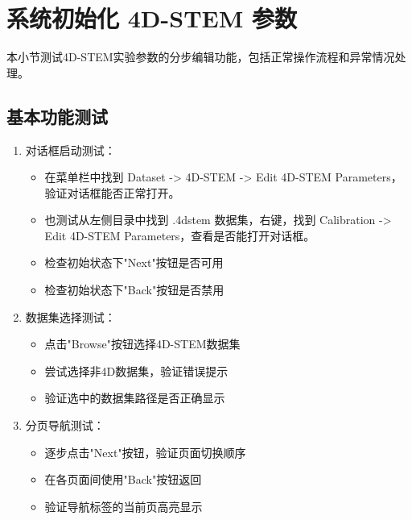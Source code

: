 \documentclass[a4paper,12pt]{report}	%
\begin{document}
\section{系统初始化 4D-STEM 参数}

本小节测试4D-STEM实验参数的分步编辑功能，包括正常操作流程和异常情况处理。

\subsection{基本功能测试}
\begin{enumerate}
    \item 对话框启动测试：
    \begin{itemize}
        \item 在菜单栏中找到 Dataset -> 4D-STEM -> Edit 4D-STEM Parameters， 验证对话框能否正常打开。
        \item 也测试从左侧目录中找到 .4dstem 数据集，右键，找到 Calibration -> Edit 4D-STEM Parameters，查看是否能打开对话框。
        \item 检查初始状态下"Next"按钮是否可用
        \item 检查初始状态下"Back"按钮是否禁用
    \end{itemize}
    
    \item 数据集选择测试：
    \begin{itemize}
        \item 点击"Browse"按钮选择4D-STEM数据集
        \item 尝试选择非4D数据集，验证错误提示
        \item 验证选中的数据集路径是否正确显示
    \end{itemize}
    
    \item 分页导航测试：
    \begin{itemize}
        \item 逐步点击"Next"按钮，验证页面切换顺序
        \item 在各页面间使用"Back"按钮返回
        \item 验证导航标签的当前页高亮显示
    \end{itemize}
\end{enumerate}
\end{document}
